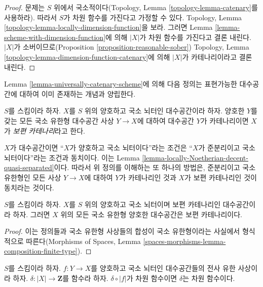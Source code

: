 \begin{proof}
문제는 $S$ 위에서 국소적이다(Topology, Lemma
\ref{topology-lemma-catenary}를 사용하라). 따라서 $S$가 차원
함수를 가진다고 가정할 수 있다. Topology, Lemma
\ref{topology-lemma-locally-dimension-function}을 보라.
그러면 Lemma \ref{lemma-scheme-with-dimension-function}에 의해
$|X|$가 차원 함수를 가진다고 결론 내린다.
$|X|$가 소버이므로(Proposition \ref{proposition-reasonable-sober})
Topology, Lemma \ref{topology-lemma-dimension-function-catenary}에
의해 $|X|$가 카테나리이라고 결론 내린다.
\end{proof}

\noindent
Lemma \ref{lemma-universally-catenary-scheme}에 의해 다음 정의는
표현가능한 대수공간에 대하여 이미 존재하는 개념과 양립한다.

\begin{definition}
\label{definition-universally-catenary}
$S$를 스킴이라 하자. $X$를 $S$ 위의 양호하고 국소 뇌터인
대수공간이라 하자. 양호한 $Y$를 갖는 모든 국소 유한형 대수공간
사상 $Y \to X$에 대하여 대수공간 $Y$가 카테나리이면 $X$가
{\it 보편 카테나리}라고 한다.
\end{definition}

\noindent
$X$가 대수공간이면 “$X$가 양호하고 국소 뇌터이다”라는 조건은
“$X$가 준분리이고 국소 뇌터이다”라는 조건과 동치이다.
이는 Lemma \ref{lemma-locally-Noetherian-decent-quasi-separated}이다.
따라서 위 정의를 이해하는 또 하나의 방법은, 준분리이고 국소 유한형인
모든 사상 $Y \to X$에 대하여 $Y$가 카테나리인 것과 $X$가 보편
카테나리인 것이 동치라는 것이다.

\begin{lemma}
\label{lemma-universally-catenary}
$S$를 스킴이라 하자. $X$를 $S$ 위의 양호하고 국소 뇌터이며 보편
카테나리인 대수공간이라 하자. 그러면 $X$ 위의 모든 국소 유한형
양호한 대수공간은 보편 카테나리이다.
\end{lemma}

\begin{proof}
이는 정의들과 국소 유한형 사상들의 합성이 국소 유한형이라는 사실에서
형식적으로 따른다(Morphisms of Spaces, Lemma
\ref{spaces-morphisms-lemma-composition-finite-type}).
\end{proof}

\begin{lemma}
\label{lemma-check-dimension-function-finite-cover}
$S$를 스킴이라 하자. $f : Y \to X$를 양호하고 국소 뇌터인
대수공간들의 전사 유한 사상이라 하자.
$\delta : |X| \to \mathbf{Z}$를 함수라 하자.
$\delta \circ |f|$가 차원 함수이면 $\delta$는 차원 함수이다.
\end{lemma}


